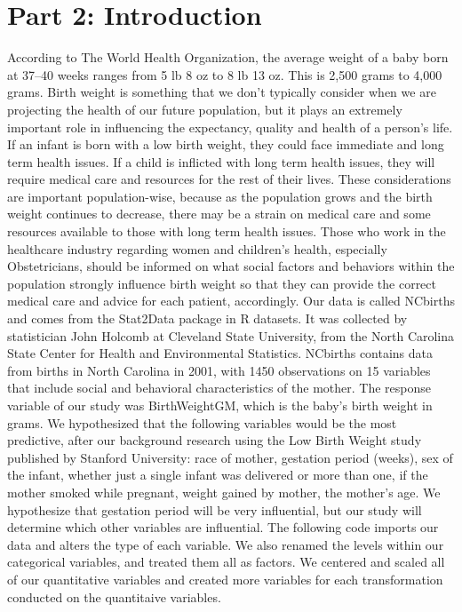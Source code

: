 \documentclass{article}\usepackage[]{graphicx}\usepackage[]{xcolor}
\begin{document}
\section{Part 2: Introduction}
According to The World Health Organization, the average weight of a baby born at 37–40 weeks ranges from 5 lb 8 oz to 8 lb 13 oz. This is 2,500 grams to 4,000 grams. Birth weight is something that we don't typically consider when we are projecting the health of our future population, but it plays an extremely important role in influencing the expectancy, quality and health of a person's life. If an infant is born with a low birth weight, they could face immediate and long term health issues. If a child is inflicted with long term health issues, they will require medical care and resources for the rest of their lives. These considerations are important population-wise, because as the population grows and the birth weight continues to decrease, there may be a strain on medical care and some resources available to those with long term health issues. Those who work in the healthcare industry regarding women and children's health, especially Obstetricians, should be informed on what social factors and behaviors within the population strongly influence birth weight so that they can provide the correct medical care and advice for each patient, accordingly. Our data is called NCbirths and comes from the Stat2Data package in R datasets. It was collected by statistician John Holcomb at Cleveland State University, from the North Carolina State Center for Health and Environmental Statistics.
NCbirths contains data from births in North Carolina in 2001, with 1450 observations on 15 variables that include social and behavioral characteristics of the mother. The response variable of our study was BirthWeightGM, which is the baby's birth weight in grams. We hypothesized that the following variables would be the most predictive, after our background research using the Low Birth Weight study published by Stanford University: race of mother, gestation period (weeks), sex of the infant, whether just a single infant was delivered or more than one, if the mother smoked while pregnant, weight gained by mother, the mother's age. We hypothesize that gestation period will be very influential, but our study will determine which other variables are influential. The following code imports our data and alters the type of each variable. We also renamed the levels within our categorical variables, and treated them all as factors. We centered and scaled all of our quantitative variables and created more variables for each transformation conducted on the quantitaive variables. 
\end{document}
